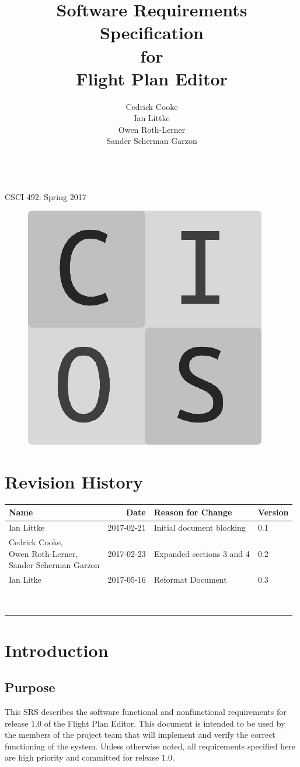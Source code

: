 \documentclass[12pt, letterpaper]{article}
\title{Software Requirements Specification\\for\\Flight Plan Editor}
\date{}
\author{
Cedrick Cooke\\
Ian Littke\\
Owen Roth-Lerner\\
Sander Scherman Garzon
}
\makeatletter
\renewcommand{\maketitle}{\bgroup\setlength{\parindent}{0pt}
\thispagestyle{empty}
\null
  \begin{flushleft}
  \vspace{15mm}
  \vskip2mm
  \Huge{\textbf{\@title}}
  \vspace{5cm}
\\CSCI 492: Spring 2017\\
  \begin{figure}[!ht]
    \includegraphics[scale=0.5]{cios.png}
  \end{figure}

  \@author
  \end{flushleft}\egroup
}
\makeatother
\begin{document}
\maketitle

\newpage
\section*{Revision History}
\begin{tabularx}{\textwidth}{|l|r|X|l|}
\textbf{Name} & \textbf{Date} & \textbf{Reason for Change} & \textbf{Version} \\ \hline \hline
Ian Littke & 2017-02-21 & Initial document blocking & 0.1 \\ \hline
\makecell[cl]{Cedrick Cooke,\\ Owen Roth-Lerner,\\ Sander Scherman Garzon} & 2017-02-23 & Expanded sections 3 and 4 & 0.2 \\ \hline
Ian Litke & 2017-05-16 & Reformat Document & 0.3 \\ \hline
          &            &                   &     \\ \hline
          &            &                   &     \\ \hline
          &            &                   &     \\ \hline
          &            &                   &     \\ \hline
          &            &                   &     \\ \hline
          &            &                   &     \\ \hline
          &            &                   &     \\ \hline
          &            &                   &     \\ \hline
          &            &                   &     \\ \hline
\end{tabularx}

\newpage
\setcounter{page}{1}
\tableofcontents
\newpage
{}
\setcounter{page}{1}

\section{Introduction}
  \subsection{Purpose}
    This SRS describes the software functional and nonfunctional requirements
    for release 1.0 of the Flight Plan Editor.
    This document is intended to be used by the members of the project team that will implement
    and verify the correct functioning of the system.
    Unless otherwise noted, all requirements specified here are high priority
    and committed for release 1.0.
\end{document}

